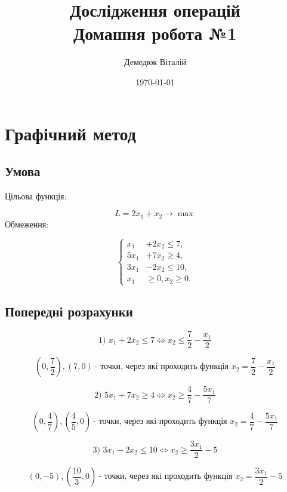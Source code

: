 \documentclass[a4paper, 12pt]{article}
\author{Демедюк Віталій}
\title{Дослідження операцій\\
	   Домашня робота №1}
\date{\today}
\begin{document}
\maketitle
\newpage

\tableofcontents


\newpage

\section{Графічний метод}

\subsection{Умова}
Цільова функція:

\begin{equation}
L = 2x_1 + x_2 \rightarrow \max
\end{equation}
Обмеження:

\begin{equation}
\left\{
\begin{aligned}
	x_1 &+ 2x_2 \leq 7,\\
	5x_1 &+ 7x_2 \geq 4,\\
	3x_1 &- 2x_2 \leq 10,\\
	x_1 &\geq 0, x_2 \geq 0. 
\end{aligned}
\right.
\end{equation}

\subsection{Попередні розрахунки}

\[ \text{1) } x_1 + 2x_2 \leq 7 \Longleftrightarrow 
	x_2 \leq \frac{7}{2} - \frac{x_1}{2} \]

\[ \left(0,\frac{7}{2}\right), \left(7,0\right)\ \text{- точки, через які проходить функція } x_2 = \frac{7}{2} - \frac{x_1}{2} \]

\[ \text{2) } 5x_1 + 7x_2 \geq 4 \Longleftrightarrow 
	 x_2 \geq \frac{4}{7} - \frac{5x_1}{7} \]

\[ \left(0,\frac{4}{7}\right), \left(\frac{4}{5},0\right)\ \text{- точки, через які проходить функція } x_2 = \frac{4}{7} - \frac{5x_1}{7} \]

\[ \text{3) } 3x_1 - 2x_2 \leq 10 \Longleftrightarrow 
	 x_2 \geq \frac{3x_1}{2} - 5 \]

\[ \left(0,-5\right), \left(\frac{10}{3},0\right)\ \text{- точки, через які проходить функція } x_2 = \frac{3x_1}{2} - 5 \]
\end{document}
